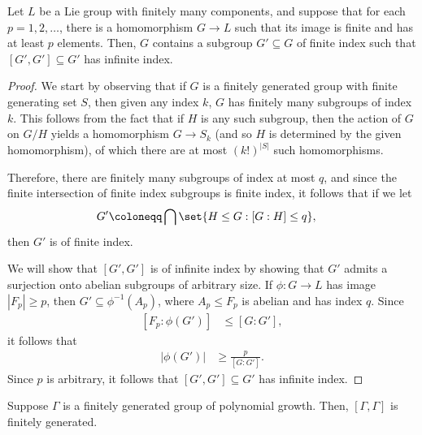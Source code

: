 \documentclass[10pt]{mypackage}
\renewcommand{\coloneq}{\coloneqq}
\begin{document}
\begin{lemma}[Lemma (a)]
  Let $L$ be a Lie group with finitely many components, and suppose that for each $p=1,2,\dots$, there is a homomorphism $G\to L$ such that its image is finite and has at least $p$ elements. Then, $G$ contains a subgroup $G'\subseteq G$ of finite index such that $\left[ G',G' \right]\subseteq G'$ has infinite index.
\end{lemma}
\begin{proof}
  We start by observing that if $G$ is a finitely generated group with finite generating set $S$, then given any index $k$, $G$ has finitely many subgroups of index $k$. This follows from the fact that if $H$ is any such subgroup, then the action of $G$ on $G/H$ yields a homomorphism $G\to S_k$ (and so $H$ is determined by the given homomorphism), of which there are at most $\left( k! \right)^{\left\vert S \right\vert}$ such homomorphisms.

  Therefore, there are finitely many subgroups of index at most $q$, and since the finite intersection of finite index subgroups is finite index, it follows that if we let
  \begin{align*}
    G' &\coloneq \bigcap\set{H\leq G : \left[ G:H \right]\leq q},
  \end{align*}
  then $G'$ is of finite index.

  We will show that $\left[ G',G' \right]$ is of infinite index by showing that $G'$ admits a surjection onto abelian subgroups of arbitrary size. If $\phi\colon G\to L$ has image $\left\vert F_p \right\vert\geq p$, then $G'\subseteq \phi^{-1}\left( A_p \right) $, where $A_p\leq F_p$ is abelian and has index $q$. Since
  \begin{align*}
    \left[ F_p:\phi\left( G' \right) \right] &\leq \left[ G:G' \right],
  \end{align*}
  it follows that
  \begin{align*}
    \left\vert \phi\left( G' \right) \right\vert &\geq \frac{p}{\left[ G:G' \right]}.
  \end{align*}
  Since $p$ is arbitrary, it follows that $\left[ G',G' \right]\subseteq G'$ has infinite index.
\end{proof}
\begin{lemma}[Lemma (b)]
  Suppose $\Gamma$ is a finitely generated group of polynomial growth. Then, $\left[ \Gamma,\Gamma \right]$ is finitely generated.
\end{lemma}
\end{document}
